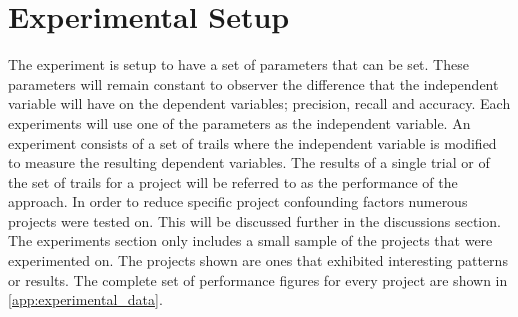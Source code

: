 





\section{Experimental Setup}


The experiment is setup to have a set of parameters that can be set. These parameters will remain constant to observer the difference that the independent variable will have on the dependent variables; precision, recall and accuracy. Each experiments will use one of the parameters as the independent variable. An experiment consists of a set of trails where the independent variable is modified to measure the resulting dependent variables. The results of a single trial or of the set of trails for a project will be referred to as the performance of the approach. In order to reduce specific project confounding factors numerous projects were tested on. This will be discussed further in the discussions section. The experiments section only includes a small sample of the projects that were experimented on. The projects shown are ones that exhibited interesting patterns or results. The complete set of performance figures for every project are shown in \autoref{app:experimental_data}.

